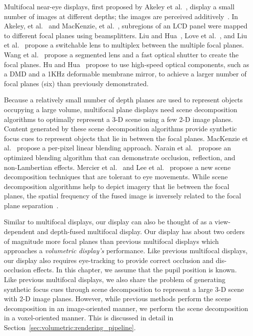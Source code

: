 Multifocal near-eye displays, first proposed by Akeley et al.~\cite{Akeley2004}, display a small number of images at different depths; the images are perceived additively~\cite{Akeley2004,MacKenzie2010Accommodation,Liu2010novel,Love2009high,Hu2015Design}. In Akeley, et al.~\cite{Akeley2004} and MacKenzie, et al.~\cite{MacKenzie2010Accommodation}, subregions of an LCD panel were mapped to different focal planes using beamsplitters. Liu and Hua~\cite{liu2009time}, Love et al.~\cite{Love2009high}, and Liu et al.~\cite{Liu2010novel} propose a switchable lens to multiplex between the multiple focal planes. Wang et al.~\cite{wang2018digitally} propose a segmented lens and a fast optical shutter to create the focal planes.  Hu and Hua~\cite{Hu2014design,Hu2014High,Hu2015Design} propose to use high-speed optical components, such as a DMD and a 1KHz deformable membrane mirror, to achieve a larger number of focal planes (six) than previously demonstrated. 

Because a relatively small number of depth planes are used to represent objects occupying a large volume, multifocal plane displays need scene decomposition algorithms to optimally represent a 3-D scene using a few 2-D image planes. Content generated by these scene decomposition algorithms provide synthetic focus cues to represent objects that lie in between the focal planes. MacKenzie et al.~\cite{MacKenzie2010Accommodation} propose a per-pixel linear blending approach. Narain et al.~\cite{Narain2015optimal} propose an optimized blending algorithm that can demonstrate occlusion, reflection, and non-Lambertian effects. Mercier et al.~\cite{Mercier2017Fast} and Lee et al.~\cite{Lee2017foveated} propose a new scene decomposition techniques that are tolerant to eye movements. While scene decomposition algorithms help to depict imagery that lie between the focal planes, the spatial frequency of the fused image is inversely related to the focal plane separation~\cite{Hu2014design, Hua2017Enabling}. 

Similar to multifocal displays, our display can also be thought of as a view-dependent and depth-fused multifocal display. Our display has about two orders of magnitude more focal planes than previous multifocal displays which approaches a \emph{volumetric display's} performance. Like previous multifocal displays, our display also requires eye-tracking to provide correct occlusion and dis-occlusion effects. In this chapter, we assume that the pupil position is known. Like previous multifocal displays, we also share the problem of generating synthetic focus cues through scene decomposition to represent a large 3-D scene with 2-D image planes. However, while previous methods perform the scene decomposition in an image-oriented manner, we perform the scene decomposition in a voxel-oriented manner. This is discussed in detail in Section~\ref{sec:volumetric:rendering_pipeline}. 

